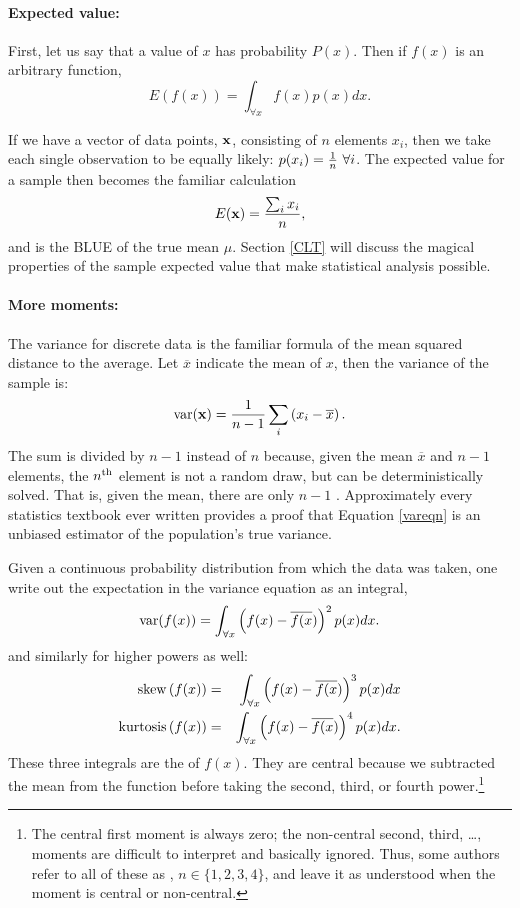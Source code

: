 \paragraph{Expected value:} 
First, let us say that a value of $x$ has probability $P(x)$. Then
if $f(x)$ is an arbitrary function, 
$$E\left(f(x)\right)=\int_{\forall x} f(x)p(x) dx.$$

If we have a vector of data points, ${\bf x}$, consisting of $n$ elements
$x_i$, then we take each single observation to be equally likely:
$p(x_i)={1\over n}\ \forall i$.  The expected value for a sample then
becomes the familiar calculation $$E({\bf x})={\sum_i x_i\over n},$$ and is
the BLUE of the true mean $\mu$. Section
\ref{CLT} will discuss the magical properties of the sample expected
value that make statistical analysis possible.

\paragraph{More moments:}   
The variance for discrete data is the familiar formula of the mean
squared distance to the average. Let $\overline x$ indicate the mean of
$x$, then the variance of the sample is:
\begin{equation}
\operatorname{var}({\bf x}) = {1\over n-1} \sum_i\left(x_i - \overline x\right).
\label{vareqn}
\end{equation}
The sum is divided by $n-1$ instead of $n$ because, given the mean
$\overline x$ and $n-1$ elements, the $n^{\rm th}$ element is not a
random draw, but can be deterministically solved. That is, given the
mean, there are only $n-1$ . Approximately
every statistics textbook ever written provides a proof that Equation
\ref{vareqn} is an unbiased estimator of the population's true variance.

Given a continuous probability distribution from which the data was
taken, one write out the
expectation in the variance equation as an integral,
$$\operatorname{var}(f(x))=\int_{\forall x} \left(f(x) - \overline{f(x})\right)^2 p(x) dx.$$
and similarly for higher powers as well:
\begin{eqnarray*}
{\rm skew}\left(f(x)\right)&=&\int_{\forall x} \left(f(x) - \overline{f(x})\right)^3 p(x) dx\\
{\rm kurtosis}\left(f(x)\right)&=&\int_{\forall x} \left(f(x) - \overline{f(x})\right)^4 p(x) dx.
\end{eqnarray*} 
These three integrals are the  of $f(x)$. They
are central because we subtracted the mean from the function before
taking the second, third, or fourth power.\footnote{The
central first moment is always zero; the non-central second, third,
\dots, moments are difficult to interpret and basically ignored. Thus,
some authors refer to all of these as , $n \in
\{1, 2, 3, 4\}$, and leave
it as understood when the moment is central or non-central.}

